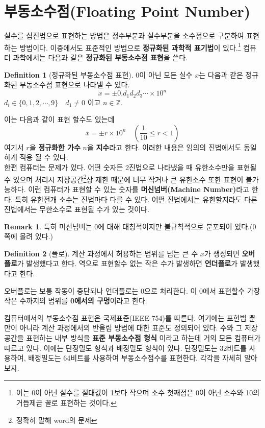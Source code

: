 \documentclass[a4paper, 11pt]{report}
\theoremstyle{definition}
\newtheorem*{defn}{Definition}
\newtheorem*{rmk}{Remark}
\begin{document}
\section{부동소수점(Floating Point Number)}
실수를 십진법으로 표현하는 방법은 정수부분과 실수부분을 소수점으로 구분하여 표현하는 방법이다.
이중에서도 표준적인 방법으로 \textbf{정규화된 과학적 표기법}이 있다.\footnote{이는 0이 아닌 실수를 절대값이 1보다 작으며 소수 첫째점은 0이 아닌 소수와 10의 거듭제곱 꼴로 표현하는 것이다.}
컴퓨터 과학에서는 다음과 같은 \textbf{정규화된 부동소수점 표현}을 쓴다.  
\begin{defn}[정규화된 부동소수점 표현]
$0$이 아닌 모든 실수 $x$는 다음과 같은 정규화된 부동소수점 표현으로 나타낼 수 있다.
\begin{equation}
    x = \pm 0.d_1d_2d_3\cdots \times 10^n
\end{equation}
$d_i \in \{0, 1, 2, \cdots ,9\} \quad d_1 \neq 0$ 이고 $n \in \mathbb{Z}$.
\end{defn}
이는 다음과 같이 표현 할수도 있는데 
\[
    x = \pm r \times 10^n \quad (\frac{1}{10} \leq r < 1)
\]
여기서 $r$을 \textbf{정규화한 가수} $n$을 \textbf{지수}라고 한다. 
이러한 내용은 임의의 진법에서도 동일하게 적용 될 수 있다. \\
한편 컴퓨터는 문제가 있다. 어떤 숫자든 2진법으로 나타냈을 때 유한소수만을 표현될 수 있으며
처리시 저장공간\footnote{정확히 말해 word의 문제}상 제한 때문에 너무 작거나 큰 유한소수 또한 표현이 불가능하다.
이런 컴퓨터가 표현할 수 있는 숫자를 \textbf{머신넘버(Machine Number)}라고 한다. 특히 유한전개 소수는 진법마다 다를 수 있다.
어떤 진법에서는 유한할지라도 다른 진법에서는 무한소수로 표현될 수가 있는 것이다. 
\begin{rmk}
    특히 머신넘버는 0에 대해 대칭적이지만 불규칙적으로 분포되어 있다.(0쪽에 몰려 있다.)
\end{rmk}
\begin{defn}[플로]
    계산 과정에서 허용하는 범위를 넘는 큰 수 $x$가 생성되면 \textbf{오버플로}가 발생했다고 한다.
    역으로 표현할수 없는 작은 수가 발생하면 \textbf{언더플로}가 발생했다고 한다.
\end{defn}
오버플로는 보통 작동이 중단되나 언더플로는 0으로 처리한다. 이 0에서 표현할수 가장 작은 수까지의 범위를 \textbf{
0에서의 구멍}이라고 한다.

컴퓨터에서의 부동소수점 표현은 국제표준(IEEE-754)를 따른다. 여기에는 표현법 뿐만이 아니라 계산 과정에서의 반올림
방법에 대한 표준도 정의되어 있다. 수와 그 저장공간을 표현하는 내부 방식을 \textbf{표준 부동소수점 형식} 이라고 하는데 거의 모든
컴퓨터가 따르고 있다. 이에는 단정밀도 형식과 배정밀도 형식이 있다. 단정밀도는 32비트를 사용하여, 배정밀도는 64비트를 사용하여
부동소수점수를 표현한다. 각각을 자세히 알아보자.
\end{document}

